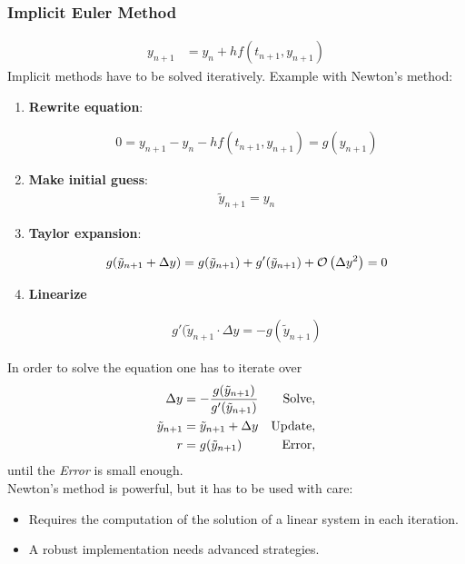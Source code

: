 \begin{multicols}{2}
\subsubsection{Implicit Euler Method}

\begin{align*}
	y_{n+1} &= y_n + hf(t_{n+1}, y_{n+1})
\end{align*}
Implicit methods have to be solved iteratively. Example with Newton's method:
\begin{enumerate}
	\item \textbf{Rewrite equation}:
	
		\begin{align*}
			0 = y_{n+1} - y_n - hf(t_{n+1}, y_{n+1}) = g(y_{n+1})
		\end{align*}
	\item \textbf{Make initial guess}:
		\begin{align*}
			\tilde y_{n+1} = y_n
		\end{align*}
	\item \textbf{Taylor expansion}:
	
		\begin{align*}
			g(\tilde y_{n+1}+\Delta y) = g(\tilde y_{n+1}) + g'(\tilde y_{n+1}) + \mathcal O\left(\Delta y^2\right) = 0
		\end{align*}
		
	\item \textbf{Linearize}
	
		\begin{align*}
			g'(\tilde y_{n+1} \cdot \Delta y = -g(\tilde y_{n+1})
		\end{align*}
\end{enumerate}
In order to solve the equation one has to iterate over
\begin{align*}
	\Delta y &=	-{g(\tilde y_{n+1}) \over g'(\tilde y_{n+1}) } & \text{Solve},\\
	\tilde y_{n+1} &= \tilde y_{n+1} + \Delta y &\text{Update},\\
	r &= g(\tilde y_{n+1}) &\text{Error},
\end{align*}
until the \emph{Error} is small enough.\\

Newton's method is powerful, but it has to be used with care:
\begin{itemize}
	\item Requires the computation of the solution of a linear system in each iteration.
	\item A robust implementation needs advanced strategies.
\end{itemize}


\end{multicols}
